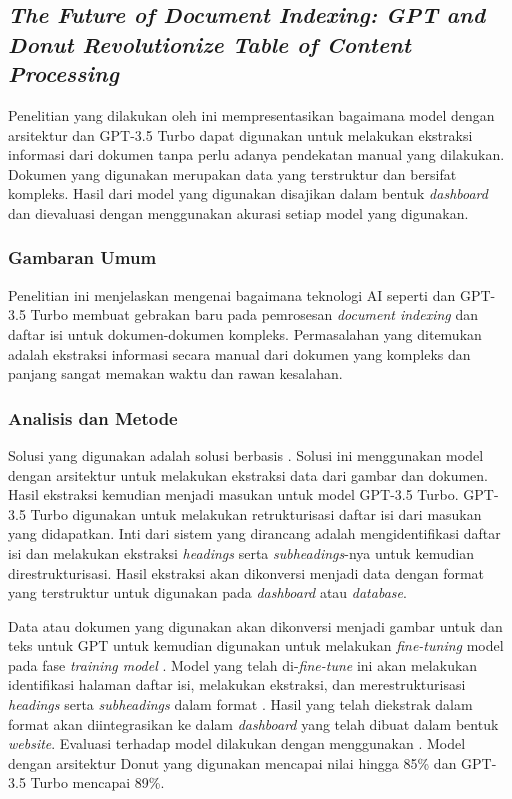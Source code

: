 \subsection{\textit{The Future of Document Indexing: GPT and Donut Revolutionize Table of Content Processing}}
\label{sec:penelitian-3}
Penelitian yang dilakukan oleh  ini mempresentasikan bagaimana model dengan arsitektur \donut{} dan GPT-3.5 Turbo dapat digunakan untuk melakukan ekstraksi informasi dari dokumen tanpa perlu adanya pendekatan manual yang dilakukan. Dokumen yang digunakan merupakan data yang terstruktur dan bersifat kompleks. Hasil dari model yang digunakan disajikan dalam bentuk 
\textit{dashboard} dan dievaluasi dengan menggunakan akurasi setiap model yang digunakan.

\subsubsection{Gambaran Umum}
Penelitian ini menjelaskan mengenai bagaimana teknologi AI seperti \donut{} dan GPT-3.5 Turbo membuat gebrakan baru pada pemrosesan \emph{document indexing} dan daftar isi untuk dokumen-dokumen kompleks. Permasalahan yang ditemukan adalah ekstraksi informasi secara manual dari dokumen yang kompleks dan panjang sangat memakan waktu dan rawan kesalahan. 

\subsubsection{Analisis dan Metode}
Solusi yang digunakan adalah solusi berbasis \dl. Solusi ini menggunakan model dengan arsitektur \donut{} untuk melakukan ekstraksi data dari gambar dan dokumen. Hasil ekstraksi kemudian menjadi masukan untuk model GPT-3.5 Turbo. GPT-3.5 Turbo digunakan untuk melakukan retrukturisasi daftar isi dari masukan yang didapatkan. Inti dari sistem yang dirancang adalah mengidentifikasi daftar isi dan melakukan ekstraksi \emph{headings} serta \emph{subheadings}-nya untuk kemudian direstrukturisasi. Hasil ekstraksi akan dikonversi menjadi data dengan format \json{} yang terstruktur untuk digunakan pada \emph{dashboard} atau \emph{database}.  

Data atau dokumen yang digunakan akan dikonversi menjadi gambar untuk \donut{} dan teks untuk GPT untuk kemudian digunakan untuk melakukan \emph{fine-tuning} model pada fase \emph{training model} \parencite{feyisa2024future}. Model yang telah di-\emph{fine-tune} ini akan melakukan identifikasi halaman daftar isi, melakukan ekstraksi, dan merestrukturisasi \emph{headings} serta \emph{subheadings} dalam format \json. Hasil yang telah diekstrak dalam format \json{} akan diintegrasikan ke dalam \emph{dashboard} yang telah dibuat dalam bentuk \emph{website}. Evaluasi terhadap model dilakukan dengan menggunakan \accuracy{}. Model dengan arsitektur Donut yang digunakan mencapai nilai \accuracy{} hingga 85\% dan GPT-3.5 Turbo mencapai \accuracy{} 89\%. 


